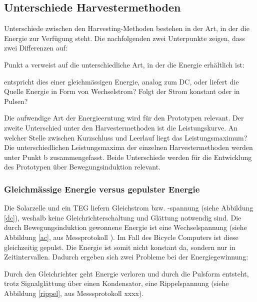 \subsection{Unterschiede Harvestermethoden}\label{harv_diff} 


Unterschiede zwischen den Harvesting-Methoden bestehen in der Art, in der die Energie zur Verfügung steht. Die nachfolgenden zwei Unterpunkte zeigen, dass zwei Differenzen auf: 

Punkt a verweist auf die unterschiedliche Art, in der die Energie erhältlich ist:

entspricht dies einer gleichmässigen Energie, analog zum DC, oder liefert die Quelle Energie in Form von Wechselstrom? Folgt der Strom konstant oder in Pulsen?

Die aufwendige Art  der Energieerntung wird für den Prototypen relevant.  Der zweite Unterschied unter den Harvestermethoden ist die Leistungskurve. An welcher Stelle zwischen Kurzschluss  und Leerlauf liegt das Leistungsmaximum? Die unterschiedlichen Leistungsmaxima der einzelnen Harvestermethoden werden unter Punkt b zusammengefasst. Beide Unterschiede werden für die Entwicklung des Prototypen über Bewegungsinduktion relevant.

\subsubsection{Gleichmässige Energie versus gepulster Energie}


Die Solarzelle und ein TEG liefern Gleichstrom bzw. -spannung (siehe Abbildung \ref{dc}), weshalb keine Gleichrichterschaltung und Glättung notwendig sind. Die durch Bewegungsinduktion gewonnene Energie ist eine Wechselspannung (siehe Abbildung \ref{ac}, aus Messprotokoll \cite{messung_opt_spule}). Im Fall des Bicycle Computers ist diese gleichzeitig gepulst.  Die Energie ist somit nicht konstant da, sondern nur in Zeitintervallen. Dadurch ergeben sich zwei Probleme bei der Energiegewinnung: 

Durch den Gleichrichter geht Energie verloren und durch die Pulsform entsteht, trotz Signalglättung über einen Kondensator, eine Rippelspannung (siehe Abbildung \ref{rippel}, aus Messsprotokoll xxxx). 

